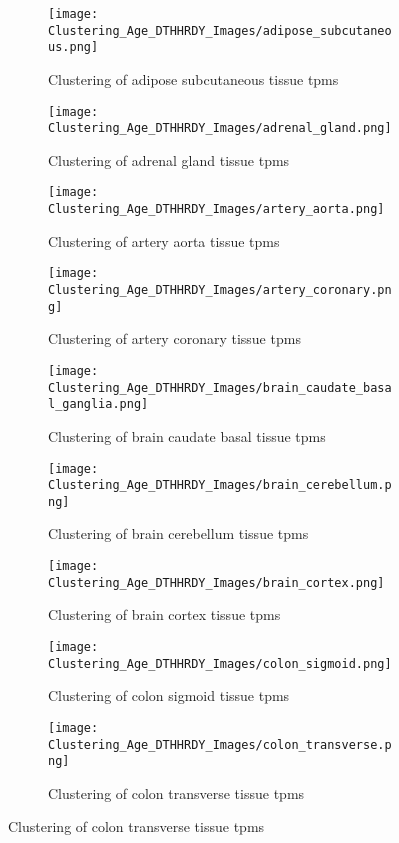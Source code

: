\documentclass[twocolumn]{article}
\begin{document}
\begin{figure}[H]
    \centering
    \begin{subfigure}{0.3\linewidth}
        \texttt{[image: Clustering\_Age\_DTHHRDY\_Images/adipose\_subcutaneous.png]}
        \caption{Clustering of adipose subcutaneous tissue tpms}
    \end{subfigure}
    \hfill
    \begin{subfigure}{0.3\linewidth}
        \texttt{[image: Clustering\_Age\_DTHHRDY\_Images/adrenal\_gland.png]}
        \caption{Clustering of adrenal gland tissue tpms}
    \end{subfigure}
    \hfill
    \begin{subfigure}{0.3\linewidth}
        \texttt{[image: Clustering\_Age\_DTHHRDY\_Images/artery\_aorta.png]}
        \caption{Clustering of artery aorta tissue tpms}
    \end{subfigure}

    \vspace{1em}

    \begin{subfigure}{0.3\linewidth}
        \texttt{[image: Clustering\_Age\_DTHHRDY\_Images/artery\_coronary.png]}
        \caption{Clustering of artery coronary tissue tpms}
    \end{subfigure}
    \hfill
    \begin{subfigure}{0.3\linewidth}
        \texttt{[image: Clustering\_Age\_DTHHRDY\_Images/brain\_caudate\_basal\_ganglia.png]}
        \caption{Clustering of brain caudate basal tissue tpms}
    \end{subfigure}
    \hfill
    \begin{subfigure}{0.3\linewidth}
        \texttt{[image: Clustering\_Age\_DTHHRDY\_Images/brain\_cerebellum.png]}
        \caption{Clustering of brain cerebellum tissue tpms}
    \end{subfigure}

    \vspace{1em}

    \begin{subfigure}{0.3\linewidth}
        \texttt{[image: Clustering\_Age\_DTHHRDY\_Images/brain\_cortex.png]}
        \caption{Clustering of brain cortex tissue tpms}
    \end{subfigure}
    \hfill
    \begin{subfigure}{0.3\linewidth}
        \texttt{[image: Clustering\_Age\_DTHHRDY\_Images/colon\_sigmoid.png]}
        \caption{Clustering of colon sigmoid tissue tpms}
    \end{subfigure}
    \hfill
    \begin{subfigure}{0.3\linewidth}
        \texttt{[image: Clustering\_Age\_DTHHRDY\_Images/colon\_transverse.png]}
        \caption{Clustering of colon transverse tissue tpms}
    \end{subfigure}


\end{figure}
\end{document}

